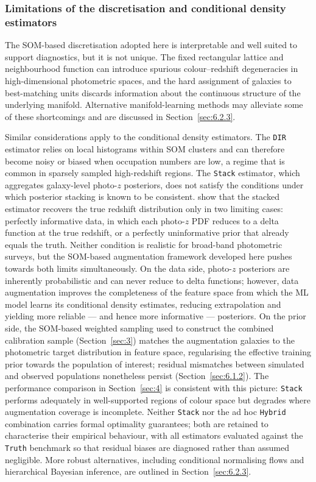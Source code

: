 \subsubsection{Limitations of the discretisation and conditional density estimators} \label{sec:6.1.4}

The SOM-based discretisation adopted here is interpretable and well suited to support diagnostics, but it is not unique. The fixed rectangular lattice and neighbourhood function can introduce spurious colour--redshift degeneracies in high-dimensional photometric spaces, and the hard assignment of galaxies to best-matching units discards information about the continuous structure of the underlying manifold. Alternative manifold-learning methods may alleviate some of these shortcomings and are discussed in Section~\ref{sec:6.2.3}.

Similar considerations apply to the conditional density estimators. The \texttt{DIR} estimator relies on local histograms within SOM clusters and can therefore become noisy or biased when occupation numbers are low, a regime that is common in sparsely sampled high-redshift regions. The \texttt{Stack} estimator, which aggregates galaxy-level photo-\(z\) posteriors, does not satisfy the conditions under which posterior stacking is known to be consistent. \citet{2021PhRvD.103h3502M} show that the stacked estimator recovers the true redshift distribution only in two limiting cases: perfectly informative data, in which each photo-\(z\) PDF reduces to a delta function at the true redshift, or a perfectly uninformative prior that already equals the truth. Neither condition is realistic for broad-band photometric surveys, but the SOM-based augmentation framework developed here pushes towards both limits simultaneously. On the data side, photo-\(z\) posteriors are inherently probabilistic and can never reduce to delta functions; however, data augmentation improves the completeness of the feature space from which the ML model learns its conditional density estimates, reducing extrapolation and yielding more reliable --- and hence more informative --- posteriors. On the prior side, the SOM-based weighted sampling used to construct the combined calibration sample (Section~\ref{sec:3}) matches the augmentation galaxies to the photometric target distribution in feature space, regularising the effective training prior towards the population of interest; residual mismatches between simulated and observed populations nonetheless persist (Section~\ref{sec:6.1.2}). The performance comparison in Section~\ref{sec:4} is consistent with this picture: \texttt{Stack} performs adequately in well-supported regions of colour space but degrades where augmentation coverage is incomplete. Neither \texttt{Stack} nor the ad hoc \texttt{Hybrid} combination carries formal optimality guarantees; both are retained to characterise their empirical behaviour, with all estimators evaluated against the \texttt{Truth} benchmark so that residual biases are diagnosed rather than assumed negligible. More robust alternatives, including conditional normalising flows and hierarchical Bayesian inference, are outlined in Section~\ref{sec:6.2.3}.

